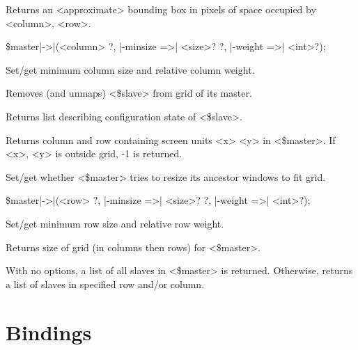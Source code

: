 \begin{enum}{1cm}

Returns an <approximate> bounding box in pixels of space occupied by <column>, <row>.

\item[\$master|->|\kwd{gridColumnconfigure}(<column> ?, |-minsize =>| <size>?]
  ?, |-weight =>| <int>?);\strut\newline
Set/get minimum column size and relative column weight.

Removes (and unmaps) <\$slave> from grid of its master.

Returns list describing configuration state of <\$slave>.

Returns column and row containing screen units <x> <y> in <\$master>.
If <x>, <y> is outside grid, -1 is returned.

Set/get whether <\$master> tries to resize its ancestor windows to fit grid.

\item[\$master|->|\kwd{gridRowconfigure}(<row> ?, |-minsize =>| <size>?]
  ?, |-weight =>| <int>?);\strut\newline
Set/get minimum row size and relative row weight.

Returns size of grid (in columns then rows) for <\$master>.

With no options, a list of all slaves in <\$master> is returned.
Otherwise, returns a list of slaves in specified row and/or column.

\end{enum}


\section{Bindings}

